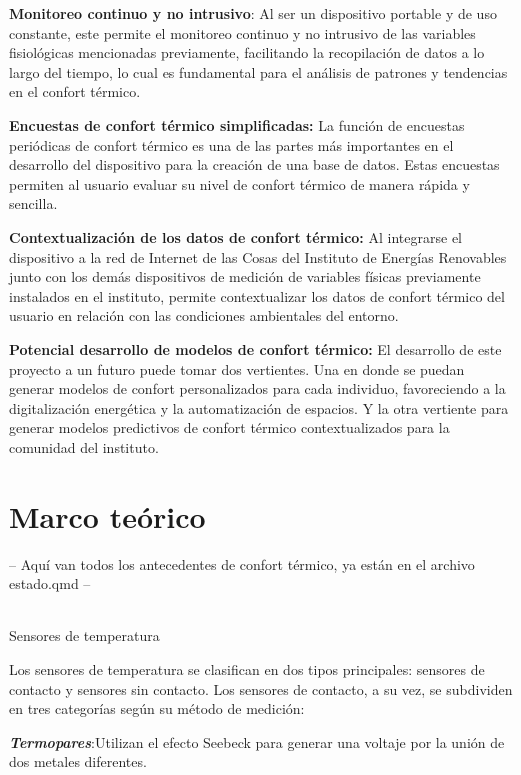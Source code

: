 \documentclass[
  letterpaper,
  DIV=11,
  numbers=noendperiod]{scrreport}
\makeatletter
\let\oldsubparagraph\subparagraph
\renewcommand{\subparagraph}{
    \@ifstar
      \xxxSubParagraphStar
      \xxxSubParagraphNoStar
  }
\newcommand{\xxxSubParagraphStar}[1]{\oldsubparagraph*{#1}\mbox{}}
\newcommand{\xxxSubParagraphNoStar}[1]{\oldsubparagraph{#1}\mbox{}}
\makeatother
\begin{document}
\textbf{Monitoreo continuo y no intrusivo}: Al ser un dispositivo
portable y de uso constante, este permite el monitoreo continuo y no
intrusivo de las variables fisiológicas mencionadas previamente,
facilitando la recopilación de datos a lo largo del tiempo, lo cual es
fundamental para el análisis de patrones y tendencias en el confort
térmico.

\textbf{Encuestas de confort térmico simplificadas:} La función de
encuestas periódicas de confort térmico es una de las partes más
importantes en el desarrollo del dispositivo para la creación de una
base de datos. Estas encuestas permiten al usuario evaluar su nivel de
confort térmico de manera rápida y sencilla.

\textbf{Contextualización de los datos de confort térmico:} Al
integrarse el dispositivo a la red de Internet de las Cosas del
Instituto de Energías Renovables junto con los demás dispositivos de
medición de variables físicas previamente instalados en el instituto,
permite contextualizar los datos de confort térmico del usuario en
relación con las condiciones ambientales del entorno.

\textbf{Potencial desarrollo de modelos de confort térmico:} El
desarrollo de este proyecto a un futuro puede tomar dos vertientes. Una
en donde se puedan generar modelos de confort personalizados para cada
individuo, favoreciendo a la digitalización energética y la
automatización de espacios. Y la otra vertiente para generar modelos
predictivos de confort térmico contextualizados para la comunidad del
instituto.


\chapter{Marco teórico}\label{marco-teuxf3rico}

-- Aquí van todos los antecedentes de confort térmico, ya están en el
archivo estado.qmd --

\subparagraph{Sensores de temperatura}\label{sensores-de-temperatura}

Los sensores de temperatura se clasifican en dos tipos principales:
sensores de contacto y sensores sin contacto. Los sensores de contacto,
a su vez, se subdividen en tres categorías según su método de medición:

\textbf{\emph{Termopares}}:Utilizan el efecto Seebeck para generar una
voltaje por la unión de dos metales diferentes.
\end{document}
